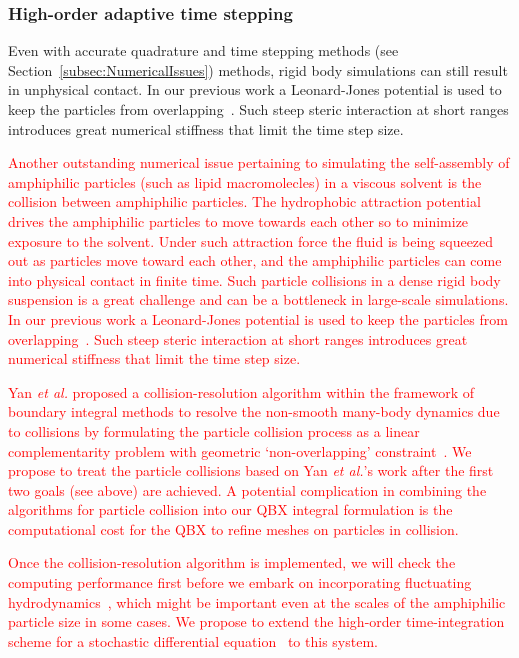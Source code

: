 \subsubsection{High-order adaptive time stepping}
\label{subsec:timeStepping}

Even with accurate quadrature and time stepping methods (see
Section~\ref{subsec:NumericalIssues}) methods, rigid body simulations
can still result in unphysical contact. In our previous work a
Leonard-Jones potential is used to keep the particles from
overlapping~\cite{Fu2018_SIAM}. Such steep steric interaction at short
ranges introduces great numerical stiffness that limit the time step
size. 

\textcolor{red}{
Another outstanding numerical issue pertaining to simulating the
self-assembly of amphiphilic particles (such as lipid macromolecles) in
a viscous solvent is the collision between amphiphilic particles. The
hydrophobic attraction potential drives the amphiphilic particles to
move towards each other so to minimize exposure to the solvent. Under
such attraction force the fluid is being squeezed out as particles move
toward each other, and the amphiphilic particles can come into physical
contact in finite time. Such particle collisions in a dense rigid body
suspension is a great challenge and can be a bottleneck in large-scale
simulations. In our previous work a Leonard-Jones potential is used to
keep the particles from overlapping~\cite{Fu2018_SIAM}. Such steep
steric interaction at short ranges introduces great numerical stiffness
that limit the time step size. 
}

\textcolor{red}{
Yan {\it et al.} proposed a collision-resolution algorithm within the
framework of boundary integral methods to resolve the non-smooth
many-body dynamics due to collisions by formulating the particle
collision process as a linear complementarity problem with geometric
`non-overlapping' constraint~\cite{Yan2019}. We propose to treat the
particle collisions based on Yan {\it et al.}'s work after the first two
goals (see above) are achieved. A potential complication in combining
the algorithms for particle collision into our QBX integral formulation
is the computational cost for the QBX to refine meshes on particles in
collision.
}

\textcolor{red}{
Once the collision-resolution algorithm is implemented, we will check
the computing performance first before we embark on incorporating
fluctuating hydrodynamics~\cite{Bao17,Bao18}, which might be important
even at the scales of the amphiphilic particle size in some cases. We
propose to extend the high-order time-integration scheme for a
stochastic differential equation~\cite{fu2015pre} to this system.
}


